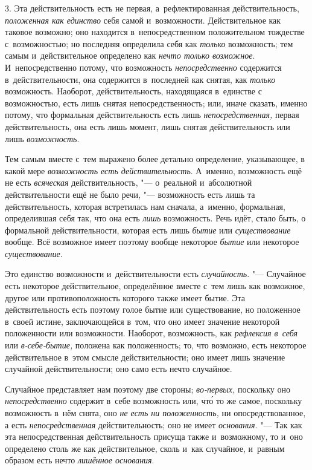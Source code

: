 3. Эта действительность есть не первая, а~рефлектированная действительность,
{\em положенная как единство} себя самой и~возможности.
Действительное как таковое возможно; оно находится в~непосредственном
положительном тождестве с~возможностью; но последняя определила себя как
{\em только} возможность; тем самым и~действительное
определено как {\em нечто только возможное}.
И~непосредственно потому, что возможность
{\em непосредственно} содержится в~действительности,
она содержится в~последней как снятая, как {\em только}
возможность. Наоборот, действительность, находящаяся в~единстве с
возможностью, есть лишь снятая непосредственность; или, иначе сказать,
именно потому, что формальная действительность есть лишь
{\em непосредственная,} первая действительность, она
есть лишь момент, лишь снятая действительность или лишь
{\em возможность}.

Тем самым вместе с~тем выражено более детально определение, указывающее, в
какой мере {\em возможность есть действительность}.
А~именно, возможность ещё не есть {\em всяческая}
действительность, "--- о~реальной и~абсолютной действительности ещё не было
речи, "--- возможность есть лишь та действительность, которая встретилась нам
сначала, а~именно, формальная, определившая себя так, что она есть
{\em лишь} возможность. Речь идёт, стало быть, о
формальной действительности, которая есть лишь
{\em бытие} или {\em существование}
вообще. Всё возможное имеет поэтому вообще некоторое
{\em бытие} или некоторое
{\em существование}.

Это единство возможности и~действительности есть
{\em случайность}. "--- Случайное есть некоторое
действительное, определённое вместе с~тем лишь как возможное, другое или
противоположность которого также имеет бытие. Эта действительность есть
поэтому голое бытие или существование, но положенное в~своей истине,
заключающейся в~том, что оно имеет значение некоторой положенности или
возможности. Наоборот, возможность, как {\em рефлексия
в~себя} или {\em в-себе-бытие,} положена как
положенность; то, что возможно, есть некоторое действительное в~этом смысле
действительности; оно имеет лишь значение случайной действительности; оно
само есть нечто случайное.

Случайное представляет нам поэтому две стороны;
{\em во-первых,} поскольку оно
{\em непосредственно} содержит в~себе возможность или,
чт\'{о} то же самое, поскольку возможность в~нём снята, оно
{\em не есть ни положенность,} ни опосредствованное, а
есть {\em непосредственная} действительность; оно не
имеет {\em основания}. "--- Так как эта непосредственная
действительность присуща также и~возможному, то и~оно определено столь же
как действительное, сколь и~как случайное, и~равным образом есть нечто
{\em лишённое основания}.

